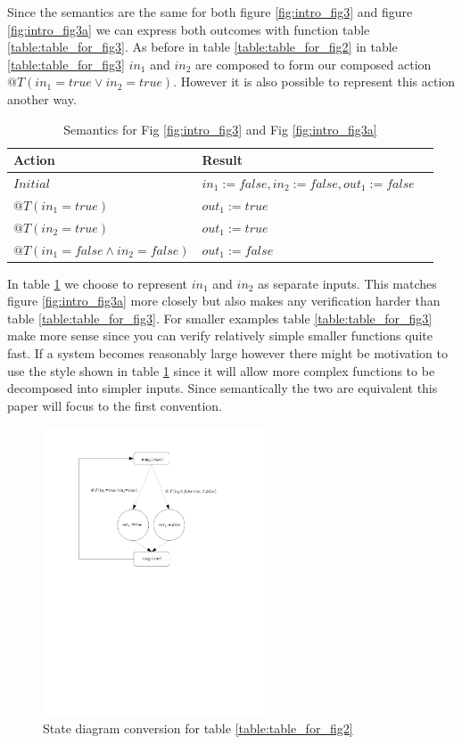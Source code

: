 Since the semantics are the same for both figure \ref{fig:intro_fig3} and figure \ref{fig:intro_fig3a} we can
express both outcomes with function table \ref{table:table_for_fig3}.
As before in table \ref{table:table_for_fig2} in table \ref{table:table_for_fig3} $in_1$ and $in_2$ are composed to form our composed action $@T(in_1 = true \vee in_2 = true)$. However it is also possible to represent this action another way.

\begin{table}[h]
    \centering
       \begin{tabular}{|l|l|l|}
        \hline
        Action & Result \\
        \hline
        $Initial$ &$in_1 := false, in_2 := false, out_1 := false$\\
        \hline
        $@T(in_1 = true)$ & $out_1 := true$ \\
        \hline
        $@T(in_2 = true)$ & $out_1 := true$ \\
        \hline
        $@T(in_1 = false \wedge in_2 = false)$ & $out_1 := false$\\
        \hline
    \end{tabular}
    \caption{Semantics for Fig \ref{fig:intro_fig3} and Fig \ref{fig:intro_fig3a}}
    \label{table:table_for_fig3a}
\end{table}

In table \ref{table:table_for_fig3a} we choose to represent $in_1$ and $in_2$ as separate inputs. This matches figure
\ref{fig:intro_fig3a} more closely but also makes any verification harder than table \ref{table:table_for_fig3}. For
smaller examples table \ref{table:table_for_fig3} make more sense since you can verify relatively simple smaller functions
quite fast. If a system becomes reasonably large however there might be motivation to use the style shown in 
table \ref{table:table_for_fig3a} since it will allow more complex functions to be decomposed into simpler inputs.
Since semantically the two are equivalent this paper will focus to the first convention.


\begin{figure}[h]
    \centering
    \includegraphics[trim= 0 140mm 40mm 10mm, clip, width=250px]{./images/intro_and_graph.pdf} %
    \caption{State diagram conversion for table \ref{table:table_for_fig2}}
    \label{fig:intro_and_graph}
\end{figure}

